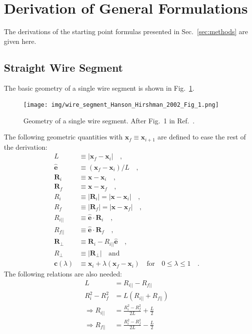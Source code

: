 \section{Derivation of General Formulations}
\label{apx:derivation_of_general_formulations}
The derivations of the starting point formulas presented in Sec.~\ref{sec:methods} are given here.

\subsection{Straight Wire Segment}
The basic geometry of a single wire segment is shown in Fig.~\ref{fig:wire_segment_Hanson_Hirshman_2002_Fig_1}.
\begin{figure}[htbp]
 \centering
 \texttt{[image: img/wire\_segment\_Hanson\_Hirshman\_2002\_Fig\_1.png]}
 \caption{Geometry of a single wire segment. After Fig.~1 in Ref.~\cite{hanson_hirshman_2002}.}
 \label{fig:wire_segment_Hanson_Hirshman_2002_Fig_1}
\end{figure}
The following geometric quantities with $\mathbf{x}_f \equiv \mathbf{x}_{i+1}$ are defined to ease the rest of the derivation:
\begin{align}
 L                   & \equiv | \mathbf{x}_f - \mathbf{x}_i | \quad , \\
 \hat{\mathbf{e}}    & \equiv \left(\mathbf{x}_f - \mathbf{x}_i\right) / L \quad , \\
 \mathbf{R}_i        & \equiv \mathbf{x} - \mathbf{x}_i \quad , \\
 \mathbf{R}_f        & \equiv \mathbf{x} - \mathbf{x}_f \quad , \\
 R_i                 & \equiv | \mathbf{R}_i | = | \mathbf{x} - \mathbf{x}_i | \quad , \\
 R_f                 & \equiv | \mathbf{R}_f | = | \mathbf{x} - \mathbf{x}_f | \quad , \\
 R_{i ||}            & \equiv \hat{\mathbf{e}} \cdot \mathbf{R}_i \quad , \\
 R_{f ||}            & \equiv \hat{\mathbf{e}} \cdot \mathbf{R}_f \quad , \\
 \mathbf{R}_\perp    & \equiv \mathbf{R}_i - R_{i ||} \hat{\mathbf{e}} \quad , \\
 R_\perp             & \equiv | \mathbf{R}_\perp | \quad \mathrm{and} \\
 \mathbf{c}(\lambda) & \equiv \mathbf{x}_i + \lambda \left(\mathbf{x}_f - \mathbf{x}_i\right) \quad \mathrm{for} \quad 0 \leq \lambda \leq 1 \quad .
\end{align}
The following relations are also needed:
\begin{align}
       L             & = R_{i ||} - R_{f ||} \\
       R_i^2 - R_f^2 & = L \left( R_{i ||} + R_{f ||} \right) \\
\Rightarrow R_{i ||} & = \frac{R_i^2 - R_f^2}{2 L} + \frac{L}{2} \\
\Rightarrow R_{f ||} & = \frac{R_i^2 - R_f^2}{2 L} - \frac{L}{2}
\end{align}

